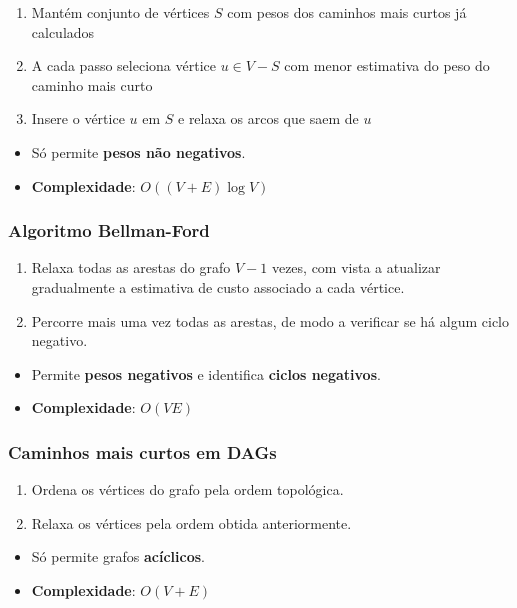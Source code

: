 \documentclass[11pt]{article}
\begin{document}
\begin{enumerate}
    \item Mantém conjunto de vértices $S$ com pesos dos caminhos mais curtos já calculados
    \item A cada passo seleciona vértice $u \in V-S$ com menor estimativa do peso do caminho mais curto
    \item Insere o vértice $u$ em $S$ e relaxa os arcos que saem de $u$
\end{enumerate}
\begin{itemize}[topsep=0pt]
    \item Só permite \textbf{pesos não negativos}.
    \item \textbf{Complexidade}: $O((V+E)\log V)$
\end{itemize}

\subsubsection{Algoritmo Bellman-Ford}

\begin{enumerate}
    \item Relaxa todas as arestas do grafo $V-1$ vezes, com vista a atualizar gradualmente a estimativa de custo associado a cada vértice.
    \item Percorre mais uma vez todas as arestas, de modo a verificar se há algum ciclo negativo.
\end{enumerate}
\begin{itemize}[topsep=0pt]
    \item Permite \textbf{pesos negativos} e identifica \textbf{ciclos negativos}.
    \item \textbf{Complexidade}: $O(VE)$
\end{itemize}

\subsubsection{Caminhos mais curtos em DAGs}

\begin{enumerate}
    \item Ordena os vértices do grafo pela ordem topológica.
    \item Relaxa os vértices pela ordem obtida anteriormente.
\end{enumerate}
\begin{itemize}[topsep=0pt]
    \item Só permite grafos \textbf{acíclicos}.
    \item \textbf{Complexidade}: $O(V + E)$
\end{itemize}
\end{document}
